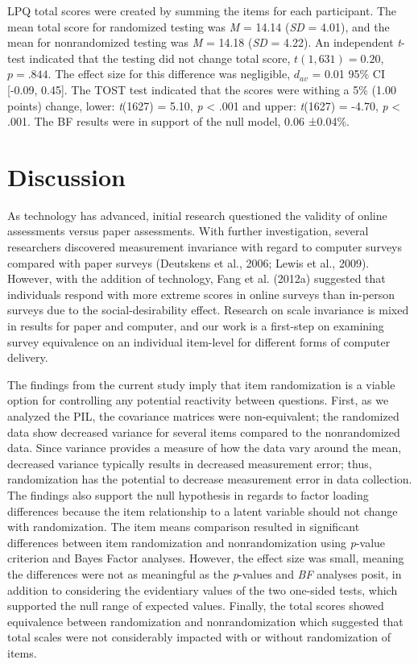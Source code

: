 \documentclass[english,man, mask]{apa6}
\theoremstyle{definition}
\theoremstyle{definition}
\theoremstyle{definition}
\theoremstyle{remark}
\begin{document}
LPQ total scores were created by summing the items for each participant.
The mean total score for randomized testing was \emph{M} = 14.14
(\emph{SD} = 4.01), and the mean for nonrandomized testing was \emph{M}
= 14.18 (\emph{SD} = 4.22). An independent \emph{t}-test indicated that
the testing did not change total score, \(t(1,631) = 0.20\),
\(p = .844\). The effect size for this difference was negligible,
\(d_{av}\) = 0.01 95\% CI {[}-0.09, 0.45{]}. The TOST test indicated
that the scores were withing a 5\% (1.00 points) change, lower:
\emph{t}(1627) = 5.10, \emph{p} \textless{} .001 and upper:
\emph{t}(1627) = -4.70, \emph{p} \textless{} .001. The BF results were
in support of the null model, 0.06 ±0.04\%.

\section{Discussion}\label{discussion}

As technology has advanced, initial research questioned the validity of
online assessments versus paper assessments. With further investigation,
several researchers discovered measurement invariance with regard to
computer surveys compared with paper surveys (Deutskens et al., 2006;
Lewis et al., 2009). However, with the addition of technology, Fang et
al. (2012a) suggested that individuals respond with more extreme scores
in online surveys than in-person surveys due to the social-desirability
effect. Research on scale invariance is mixed in results for paper and
computer, and our work is a first-step on examining survey equivalence
on an individual item-level for different forms of computer delivery.

The findings from the current study imply that item randomization is a
viable option for controlling any potential reactivity between
questions. First, as we analyzed the PIL, the covariance matrices were
non-equivalent; the randomized data show decreased variance for several
items compared to the nonrandomized data. Since variance provides a
measure of how the data vary around the mean, decreased variance
typically results in decreased measurement error; thus, randomization
has the potential to decrease measurement error in data collection. The
findings also support the null hypothesis in regards to factor loading
differences because the item relationship to a latent variable should
not change with randomization. The item means comparison resulted in
significant differences between item randomization and nonrandomization
using \emph{p}-value criterion and Bayes Factor analyses. However, the
effect size was small, meaning the differences were not as meaningful as
the \emph{p}-values and \emph{BF} analyses posit, in addition to
considering the evidentiary values of the two one-sided tests, which
supported the null range of expected values. Finally, the total scores
showed equivalence between randomization and nonrandomization which
suggested that total scales were not considerably impacted with or
without randomization of items.
\end{document}
